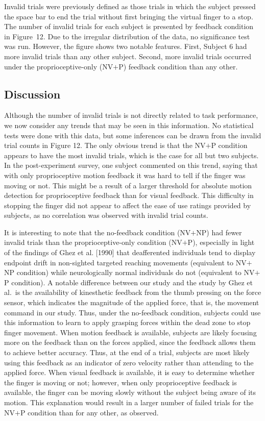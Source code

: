 \documentclass[prodmode,hillsideplop]{../acmlarge}
\begin{document}
Invalid trials were previously defined as those trials in which the
subject pressed the space bar to end the trial without first bringing
the virtual finger to a stop. The number of invalid trials for each
subject is presented by feedback condition in Figure~12. Due to the
irregular distribution of the data, no significance test was run.
However, the figure shows two notable features. First, Subject 6 had
more invalid trials than any other subject. Second, more invalid
trials occurred under the proprioceptive-only (NV$+$P) feedback
condition than any other.



\subsection{Discussion}

Although the number of invalid trials is not directly related to task
performance, we now consider any trends that may be seen in this
information. No statistical tests were done with this data, but some
inferences can be drawn from the invalid trial counts in Figure 12.
The only obvious trend is that the NV$+$P condition appears to have
the most invalid trials, which is the case for all but two subjects.
In the post-experiment survey, one subject commented on this trend,
saying that with only proprioceptive motion feedback it was hard to
tell if the finger was moving or not. This might be a result of a
larger threshold for absolute motion detection for proprioceptive
feedback than for visual feedback. This difficulty in stopping the
finger did not appear to affect the ease of use ratings provided by
subjects, as no correlation was observed with invalid trial counts.

It is interesting to note that the no-feedback condition (NV$+$NP)
had fewer invalid trials than the proprioceptive-only condition
(NV$+$P), especially in light of the findings of Ghez et al. [1990]
that deafferented individuals tend to display endpoint drift in
non-sighted targeted reaching movements (equivalent to NV$+$NP
condition) while neurologically normal individuals do not (equivalent
to NV$+$P condition). A notable difference between our study and the
study by Ghez et al.\ is the availability of kinesthetic feedback
from the thumb pressing on the force sensor, which indicates the
magnitude of the applied force, that is, the movement command in our
study. Thus, under the no-feedback condition, subjects could use this
information to learn to apply grasping forces within the dead zone to
stop finger movement. When motion feedback is available, subjects are
likely focusing more on the feedback than on the forces applied,
since the feedback allows them to achieve better accuracy. Thus, at
the end of a trial, subjects are most likely using this feedback as
an indicator of zero velocity rather than attending to the applied
force. When visual feedback is available, it is easy to determine
whether the finger is moving or not; however, when only
proprioceptive feedback is available, the finger can be moving slowly
without the subject being aware of its motion. This explanation would
result in a larger number of failed trials for the NV$+$P condition
than for any other, as observed.
\end{document}
